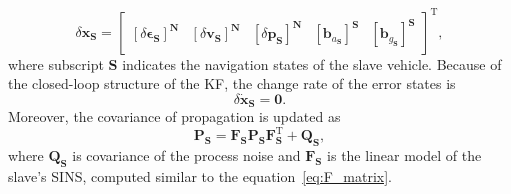 \documentclass[3p]{elsarticle}
\begin{document}
\begin{equation}
	\delta \mathbf{x}_{\mathbf{S}} = \begin{bmatrix}
	{\left[\delta {\boldsymbol{\epsilon}}_{\mathbf{S}}\right]}^{\mathbf{N}} & {\left[\delta {\mathbf{v}_{\mathbf{S}}}\right]}^{\mathbf{N}} &
	{\left[\delta {\mathbf{p}_{\mathbf{S}}}\right]}^{\mathbf{N}} &
 {\left[\mathbf{b}_{a_{\mathbf{S}}}\right]}^{\mathbf{S}} & {\left[\mathbf{b}_{g_{\mathbf{S}}}\right]}^{\mathbf{S}}
\end{bmatrix}^{\mathrm{T}},
\end{equation}
where subscript \(\mathbf{S}\) indicates the navigation states of the slave vehicle. Because of the closed-loop structure of the KF, the change rate of the error states is
\begin{equation}
	\delta \dot{\mathbf{x}}_{\mathbf{S}} = \mathbf{0}.
\end{equation}
Moreover, the covariance of propagation is updated as
\begin{equation}
	\mathbf{P}_{\mathbf{S}} = \mathbf{F}_{\mathbf{S}} \mathbf{P}_{\mathbf{S}} \mathbf{F}_{\mathbf{S}}^{\text{T}} +  \mathbf{Q}_{\mathbf{S}},
\end{equation}
where
\(\mathbf{Q}_{\mathbf{S}}\) is covariance of the process noise and
\(\mathbf{F}_{\mathbf{S}}\) is the linear model of the slave's SINS, computed similar to the equation~\eqref{eq:F_matrix}.
\end{document}

